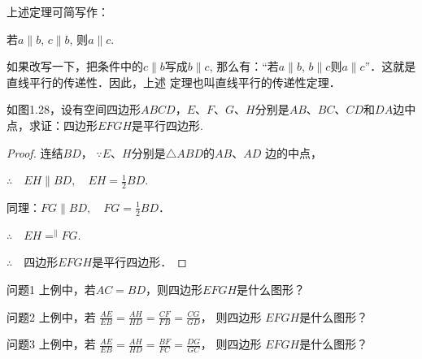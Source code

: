 上述定理可简写作：
\begin{blk}{}
  若$a\parallel b$, $c\parallel b$, 则$a\parallel c$.
\end{blk}

如果改写一下，把条件中的$c\parallel b$写成$b\parallel c$, 那么有：“若$a\parallel b$, $b\parallel c$则$a\parallel c$”．这就是直线平行的传递性．因此，上述
定理也叫直线平行的传递性定理．


\begin{example}
  如图1.28，设有空间四边形$ABCD$，$E$、$F$、$G$、$H$分别是$AB$、$BC$、$CD$和$DA$边中点，求证：四边形$EFGH$是平行四边形.
\end{example}

\begin{figure}[htp]
  \centering
{}
  \caption{}
\end{figure}


\begin{proof}
连结$BD$，
$\because E$、$H$分别是$\triangle ABD$的$AB$、$AD$
边的中点，

$\therefore\quad EH\parallel BD,\quad EH=\frac{1}{2}BD$.

同理：$FG\parallel BD,\quad FG=\frac{1}{2}BD$．

$\therefore\quad EH\displaystyle\mathop{=}^{\parallel} FG$.

$\therefore\quad $四边形$EFGH$是平行四边形．
\end{proof}

\begin{blk}{问题1}
 上例中，若$AC=BD$，则四边形$EFGH$是什么图形？
\end{blk}

\begin{blk}{问题2}
  上例中，若
$\frac{AE}{EB}=\frac{AH}{HD}=\frac{CF}{FB}=\frac{CG}{GD}$，
则四边形
$EFGH$是什么图形？
\end{blk}

\begin{blk}{问题3}
  上例中，若
  $\frac{AE}{EB}=\frac{AH}{HD}=\frac{BF}{FC}=\frac{DG}{GC}$，
则四边形
$EFGH$是什么图形？
\end{blk}

